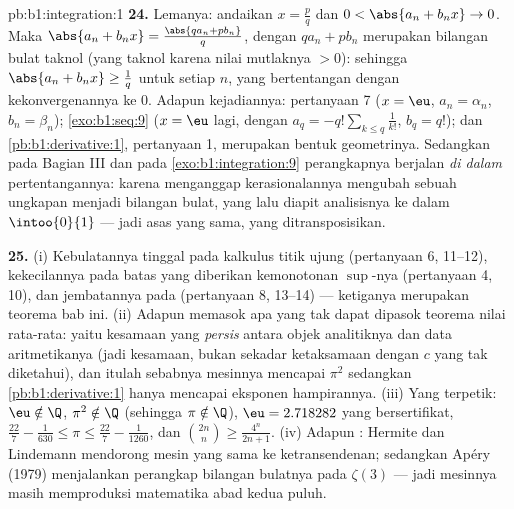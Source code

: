\begin{solution}{pb:b1:integration:1}
\textbf{24.} Lemanya: andaikan $x = \frac pq$ dan $0 < \abs{a_n +
b_n x} \to 0$. Maka $\abs{a_n + b_n x} = \frac{\abs{q a_n + p
b_n}}{q}$, dengan $q a_n + p b_n$ merupakan bilangan bulat taknol (yang taknol
karena nilai mutlaknya $> 0$): sehingga $\abs{a_n + b_n x}
\geq \frac1q$ untuk setiap $n$, yang bertentangan dengan kekonvergenannya ke
$0$. Adapun kejadiannya: pertanyaan 7 ($x = \eu$, $a_n = \alpha_n$, $b_n =
\beta_n$); \cref{exo:b1:seq:9} ($x = \eu$ lagi, dengan $a_q =
-q!\sum_{k \leq q}\frac{1}{k!}$, $b_q = q!$); dan
\cref{pb:b1:derivative:1}, pertanyaan 1, merupakan bentuk geometrinya.
Sedangkan pada Bagian III dan pada \cref{exo:b1:integration:9} perangkapnya berjalan
\emph{di dalam} pertentangannya: karena menganggap kerasionalannya mengubah
sebuah ungkapan menjadi bilangan bulat, yang lalu diapit analisisnya
ke dalam $\intoo{0}{1}$ --- jadi asas yang sama, yang ditransposisikan.

\textbf{25.} (i) Kebulatannya tinggal pada kalkulus titik ujung
 (pertanyaan 6, 11--12), kekecilannya pada batas yang
diberikan kemonotonan $\sup$-nya (pertanyaan 4, 10), dan jembatannya pada
 (pertanyaan 8, 13--14) --- ketiganya
merupakan teorema bab ini. (ii) Adapun  memasok apa yang tak dapat
dipasok teorema nilai rata-rata: yaitu kesamaan yang \emph{persis} antara
objek analitiknya dan data aritmetikanya (jadi kesamaan, bukan sekadar
ketaksamaan dengan $c$ yang tak diketahui), dan itulah sebabnya mesinnya
mencapai $\pi^2$ sedangkan \cref{pb:b1:derivative:1} hanya mencapai
eksponen hampirannya. (iii) Yang terpetik: $\eu \notin \Q$,
$\pi^2 \notin \Q$ (sehingga $\pi \notin \Q$), $\eu = 2.718282$
yang bersertifikat, $\frac{22}{7} - \frac{1}{630} \leq \pi \leq
\frac{22}{7} - \frac{1}{1260}$, dan $\binom{2n}{n} \geq
\frac{4^n}{2n+1}$. (iv) Adapun : Hermite dan Lindemann mendorong
mesin yang sama ke ketransendenan; sedangkan Apéry (1979) menjalankan
perangkap bilangan bulatnya pada $\zeta(3)$ --- jadi mesinnya masih memproduksi
matematika abad kedua puluh.

\end{solution}
